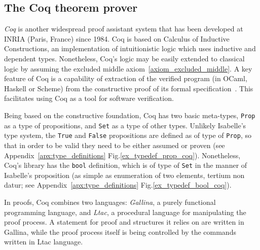 \documentclass[article]{aaltoseries}
\begin{document}
\subsection{The Coq theorem prover}
\label{sec:prover_coq}

\textit{Coq} is another widespread proof assistant system that has been developed at INRIA (Paris, France) since 1984. Coq is based on Calculus of Inductive Constructions, an implementation of intuitionistic logic which uses inductive and dependent types. Nonetheless, Coq's logic may be easily extended to classical logic by assuming the excluded middle axiom~\eqref{axiom_excluded_middle}. A key feature of Coq is a capability of extraction of the verified program (in OCaml, Haskell or Scheme) from the constructive proof of its formal specification~\cite{Letouzey08}. This facilitates using Coq as a tool for software verification.

Being based on the constructive foundation, Coq has two basic meta-types, \texttt{Prop} as a type of propositions, and \texttt{Set} as a type of other types.
Unlikely Isabelle's type system, the \texttt{True} and \texttt{False} propositions are defined as of type of \texttt{Prop}, so that in order to be valid they need to be either assumed or proven (see Appendix~\ref{apx:type_definitions} Fig.\ref{ex_typedef_prop_coq}). Nonetheless, Coq's library has the \texttt{bool} definition, which is of type of \texttt{Set} in the manner of Isabelle's proposition (as simple as enumeration of two elements, tertium non datur; see Appendix~\ref{apx:type_definitions} Fig.\ref{ex_typedef_bool_coq}).



In proofs, Coq combines two languages: \textit{Gallina}, a purely functional programming language, and \textit{Ltac}, a procedural language for manipulating the proof process. A statement for proof and structures it relies on are written in Gallina, while the proof process itself is being controlled by the commands written in Ltac language.


\end{document}
